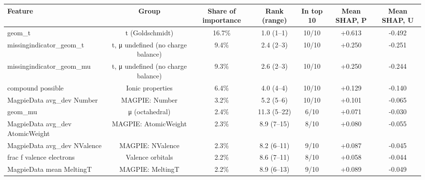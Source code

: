 \begin{tabular}{lcccccc}
\toprule
Feature & Group & Share of importance & Rank (range) & In top 10 & Mean SHAP, P & Mean SHAP, U \\
\midrule
geom\_t & t (Goldschmidt) & 16.7\% & 1.0 (1--1) & 10/10 & +0.613 & -0.492 \\
missingindicator\_geom\_t & t, μ undefined (no charge balance) & 9.4\% & 2.4 (2--3) & 10/10 & +0.250 & -0.251 \\
missingindicator\_geom\_mu & t, μ undefined (no charge balance) & 9.3\% & 2.6 (2--3) & 10/10 & +0.250 & -0.244 \\
compound possible & Ionic properties & 6.4\% & 4.0 (4--4) & 10/10 & +0.129 & -0.140 \\
MagpieData avg\_dev Number & MAGPIE: Number & 3.2\% & 5.2 (5--6) & 10/10 & +0.101 & -0.065 \\
geom\_mu & μ (octahedral) & 2.4\% & 11.3 (5--22) & 6/10 & +0.071 & -0.030 \\
MagpieData avg\_dev AtomicWeight & MAGPIE: AtomicWeight & 2.3\% & 8.9 (7--15) & 8/10 & +0.080 & -0.055 \\
MagpieData avg\_dev NValence & MAGPIE: NValence & 2.3\% & 8.2 (6--11) & 9/10 & +0.087 & -0.045 \\
frac f valence electrons & Valence orbitals & 2.2\% & 8.6 (7--11) & 8/10 & +0.058 & -0.044 \\
MagpieData mean MeltingT & MAGPIE: MeltingT & 2.2\% & 8.9 (6--13) & 9/10 & +0.089 & -0.049 \\
\bottomrule
\end{tabular}
